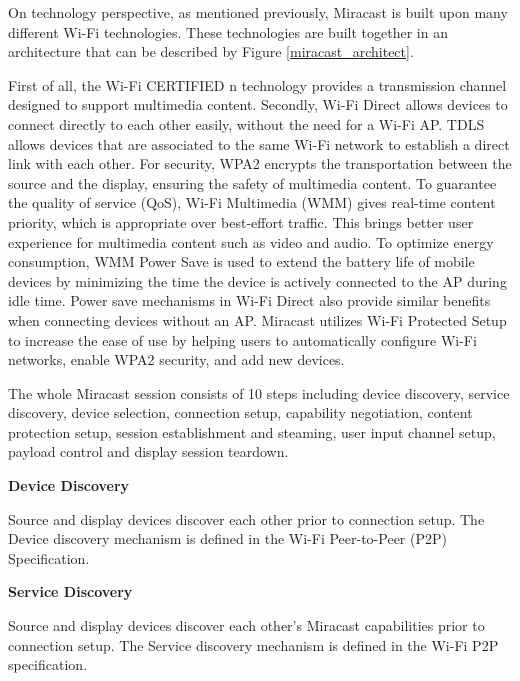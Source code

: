 On technology perspective, as mentioned previously, Miracast is built upon
many different Wi-Fi technologies. These technologies are built together in an
architecture that can be described by Figure \ref{miracast_architect}.

First of all, the Wi-Fi CERTIFIED n technology provides a transmission channel
designed to support multimedia content. Secondly, Wi-Fi Direct allows devices to
connect directly to each other easily, without the need for a Wi-Fi AP. TDLS
allows devices that are associated to the same Wi-Fi network to establish a
direct link with each other. For security, WPA2 encrypts the transportation
between the source and the display, ensuring the safety of multimedia content.
To guarantee the quality of service (QoS), Wi-Fi Multimedia (WMM) gives real-time
content priority, which is appropriate over best-effort traffic. This brings
better user experience for multimedia content such as video and audio. To
optimize energy consumption, WMM Power Save is used to extend the battery life
of mobile devices by minimizing the time the device is actively connected to
the AP during idle time. Power save mechanisms in Wi-Fi Direct also provide
similar benefits when connecting devices without an AP. Miracast utilizes 
Wi-Fi Protected Setup to increase the ease of use by helping users to
automatically configure Wi-Fi networks, enable WPA2 security, and add new
devices.

The whole Miracast session consists of 10 steps including device discovery,
service discovery, device selection, connection setup, capability negotiation,
content protection setup, session establishment and steaming, user input
channel setup, payload control and display session teardown.

\textbf{Device Discovery}

Source and display devices discover each other prior to connection setup. The Device discovery mechanism is defined in the Wi-Fi Peer-to-Peer (P2P) Specification.

\textbf{Service Discovery}

Source and display devices discover each other's Miracast capabilities prior to connection setup. The Service discovery mechanism is defined in the Wi-Fi P2P specification.

\clearpage

